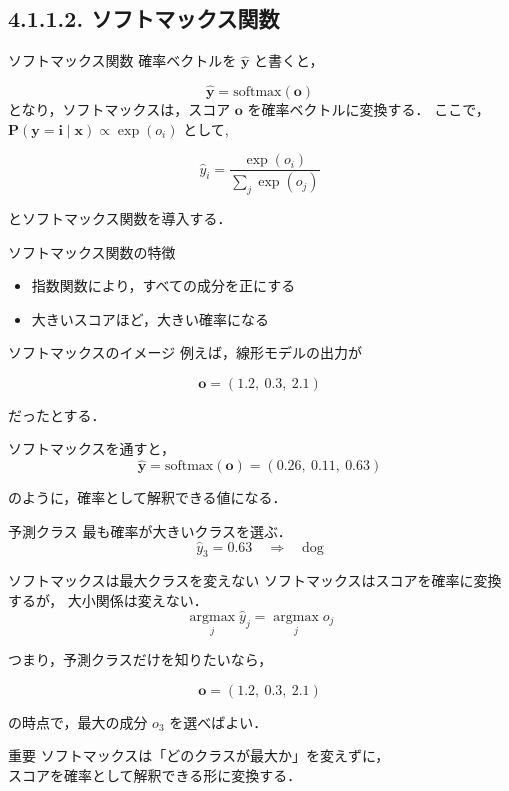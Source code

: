 \documentclass[dvipdfmx,uplatex,11pt]{beamer}
\begin{document}
\subsection{4.1.1.2. ソフトマックス関数}
\begin{frame}{ソフトマックス関数}
確率ベクトルを $\hat{\mathbf{y}}$ と書くと，

\[
\hat{\mathbf{y}} = \mathrm{softmax}(\mathbf{o})
\]
となり，ソフトマックスは，スコア $\mathbf{o}$ を確率ベクトルに変換する．
ここで，$\mathbf{P(y=i \mid \mathbf{x})} \propto \exp(o_i)$ として,

\[
\hat{y}_i
=
\frac{\exp(o_i)}
{\sum_j \exp(o_j)}
\]

とソフトマックス関数を導入する．

\vspace{1em}
\begin{block}{ソフトマックス関数の特徴}
\begin{itemize}
  \item 指数関数により，すべての成分を正にする
  \item 大きいスコアほど，大きい確率になる
\end{itemize}
\end{block}
\end{frame}

\begin{frame}{ソフトマックスのイメージ}
例えば，線形モデルの出力が

\[
\mathbf{o} = (1.2,\ 0.3,\ 2.1)
\]

だったとする．

ソフトマックスを通すと，
\[
\hat{\mathbf{y}}
=
\mathrm{softmax}(\mathbf{o})
=
(0.26,\ 0.11,\ 0.63)
\]

のように，確率として解釈できる値になる．


\begin{alertblock}{予測クラス}
最も確率が大きいクラスを選ぶ．
\[
\hat{y}_3 = 0.63
\quad \Rightarrow \quad
\text{dog}
\]
\end{alertblock}
\end{frame}

\begin{frame}{ソフトマックスは最大クラスを変えない}
ソフトマックスはスコアを確率に変換するが，
\alert{大小関係}は変えない．
\[
\operatorname*{argmax}_j \hat{y}_j
=
\operatorname*{argmax}_j o_j
\]

\vspace{1em}
つまり，予測クラスだけを知りたいなら，

\[
\mathbf{o} = (1.2,\ 0.3,\ 2.1)
\]

の時点で，最大の成分 $o_3$ を選べばよい．

\vspace{1em}
\begin{block}{重要}
ソフトマックスは「どのクラスが最大か」を変えずに，\\
スコアを\alert{確率として解釈できる形}に変換する．
\end{block}
\end{frame}
\end{document}
